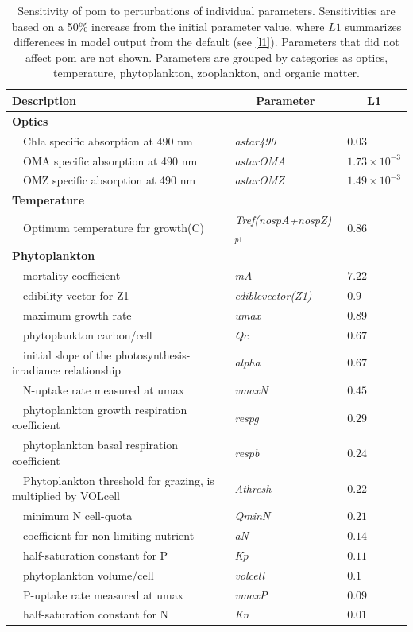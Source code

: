 \documentclass[letterpaper,12pt,oneside]{article}\usepackage[]{graphicx}\usepackage[]{color}
\begin{document}
\begin{table}[!tbp]
{\footnotesize
\caption{Sensitivity of \ac{pom} to perturbations of individual parameters.  Sensitivities are based on a 50\% increase from the initial parameter value, where $L1$ summarizes differences in model output from the default (see \cref{l1}).  Parameters that did not affect \ac{pom} are not shown.  Parameters are grouped by categories as optics, temperature, phytoplankton, zooplankton, and organic matter.\label{tab:om1sens}} 
\begin{center}
\begin{tabular}{lll}
\hline\hline
\multicolumn{1}{l}{Description}&\multicolumn{1}{c}{Parameter}&\multicolumn{1}{c}{L1}\tabularnewline
\hline
{\bfseries Optics}&&\tabularnewline
~~Chla specific absorption at 490 nm&\textit{astar490}&$0.03$\tabularnewline
~~OMA specific absorption at 490 nm&\textit{astarOMA}&$1.73\times 10^{-3}$\tabularnewline
~~OMZ specific absorption at 490 nm&\textit{astarOMZ}&$1.49\times 10^{-3}$\tabularnewline
\hline
{\bfseries Temperature}&&\tabularnewline
~~Optimum temperature for growth(C)&\textit{Tref(nospA+nospZ)$_{p1}$}&$0.86$\tabularnewline
\hline
{\bfseries Phytoplankton}&&\tabularnewline
~~mortality coefficient&\textit{mA}&$7.22$\tabularnewline
~~edibility vector for Z1&\textit{ediblevector(Z1)}&$0.9$\tabularnewline
~~maximum growth rate&\textit{umax}&$0.89$\tabularnewline
~~phytoplankton carbon/cell&\textit{Qc}&$0.67$\tabularnewline
~~initial slope of the photosynthesis-irradiance relationship&\textit{alpha}&$0.67$\tabularnewline
~~N-uptake rate measured at umax&\textit{vmaxN}&$0.45$\tabularnewline
~~phytoplankton growth respiration coefficient&\textit{respg}&$0.29$\tabularnewline
~~phytoplankton basal respiration coefficient&\textit{respb}&$0.24$\tabularnewline
~~Phytoplankton threshold for grazing, is multiplied by VOLcell&\textit{Athresh}&$0.22$\tabularnewline
~~minimum N cell-quota&\textit{QminN}&$0.21$\tabularnewline
~~coefficient for non-limiting nutrient&\textit{aN}&$0.14$\tabularnewline
~~half-saturation constant for P&\textit{Kp}&$0.11$\tabularnewline
~~phytoplankton volume/cell&\textit{volcell}&$0.1$\tabularnewline
~~P-uptake rate measured at umax&\textit{vmaxP}&$0.09$\tabularnewline
~~half-saturation constant for N&\textit{Kn}&$0.01$\tabularnewline

\end{tabular}
\end{center}}
\end{table}
\end{document}
